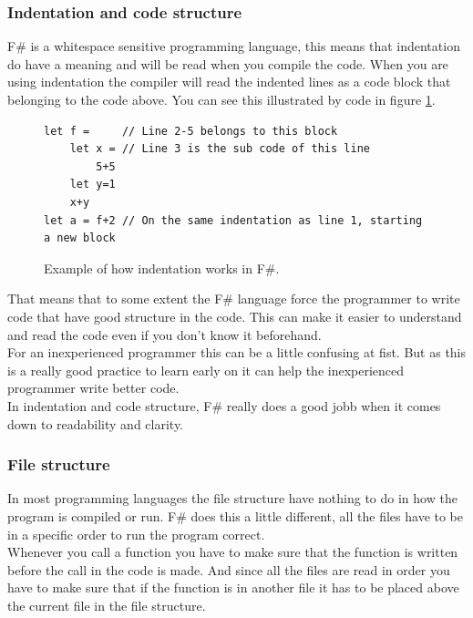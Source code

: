 \documentclass[12pt, a4paper]{article}
\begin{document}
\newpage
\subsubsection{Indentation and code structure}
\label{indentationAndCodeStructure}
F\# is a whitespace sensitive programming language, this means that indentation do have a meaning and will be read when you compile the code. When you are using indentation the compiler will read the indented lines as a code block that belonging to the code above. You can see this illustrated by code in figure \ref{fig:indentationExample}.

\begin{figure}[!h]
	\begin{lstlisting}
let f = 	// Line 2-5 belongs to this block
	let x = // Line 3 is the sub code of this line
		5+5	
	let y=1
  	x+y
let a = f+2	// On the same indentation as line 1, starting a new block
	\end{lstlisting}
	\caption{Example of how indentation works in F\#.}
	\label{fig:indentationExample}
\end{figure}

That means that to some extent the F\# language force the programmer to write code that have good structure in the code. This can make it easier to understand and read the code even if you don't know it beforehand.\\

For an inexperienced programmer this can be a little confusing at fist. But as this is a really good practice to learn early on it can help the inexperienced programmer write better code.\\

In indentation and code structure, F\# really does a good jobb when it comes down to readability and clarity.

\newpage
\subsubsection{File structure}

In most programming languages the file structure have nothing to do in how the program is compiled or run. F\# does this a little different, all the files have to be in a specific order to run the program correct.\\

Whenever you call a function you have to make sure that the function is written before the call in the code is made. And since all the files are read in order you have to make sure that if the function is in another file it has to be placed above the current file in the file structure.\\
\end{document}
